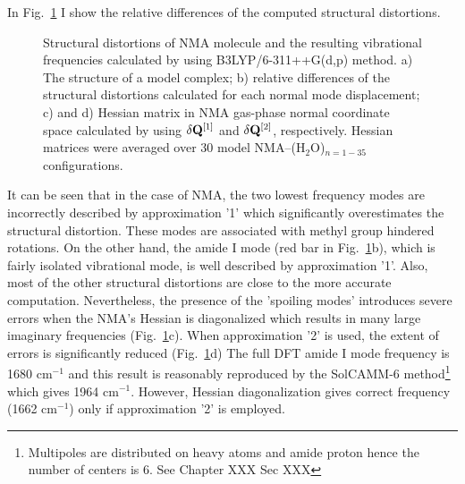 \documentclass[a4paper,titlepage,twoside,fleqn,12pt]{book}
\begin{document}
\begin{refsection}
In Fig.~\ref{f.NMA.dq} I show the relative differences of the computed structural distortions.
%
\begin{figure}[ht]
\centering
\setlength\fboxsep{0.4pt}
\setlength\fboxrule{0.5pt}
\caption{Structural distortions of NMA molecule and the resulting vibrational
frequencies calculated by using B3LYP/6-311++G(d,p) method. 
a) The structure of a model complex; b) relative differences of the
structural distortions
calculated for each normal mode displacement; c) and d) Hessian matrix in NMA gas-phase normal coordinate
space calculated by using $\delta {\bf Q}^{[1]}$ and $\delta {\bf Q}^{[2]}$, respectively.
Hessian matrices were averaged over 30 model NMA--(H$_2$O)$_{n=1-35}$ configurations.
\label{f.NMA.dq}}
\end{figure}
%
It can be seen that in the case of NMA, the two lowest frequency modes are incorrectly
described by approximation '1' which significantly overestimates the structural distortion. 
These modes are associated with methyl group hindered rotations. On the other hand, the
amide I mode (red bar in Fig.~\ref{f.NMA.dq}b), which is fairly isolated vibrational mode, is well described by 
approximation '1'. Also, most of the other structural distortions are close to the more accurate
computation. Nevertheless, the presence of the 'spoiling modes' introduces
severe errors when the NMA's Hessian is diagonalized which results in many large imaginary 
frequencies (Fig.~\ref{f.NMA.dq}c). When approximation '2' is used, the extent of errors is significantly 
reduced (Fig.~\ref{f.NMA.dq}d)
The full DFT amide I mode
frequency is 1680 cm$^{-1}$ and this result is reasonably reproduced by the SolCAMM-6 method\footnote{Multipoles
are distributed on heavy atoms and amide proton hence the number of centers is 6. See Chapter XXX Sec XXX}
which gives 1964 cm$^{-1}$. However, Hessian diagonalization gives correct frequency (1662 cm$^{-1}$) 
only if approximation '2' 
is employed.


\end{refsection}
\end{document}
